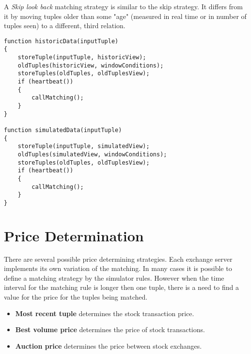 \documentclass{article}
\begin{document}
\noindent A \emph{Skip look back} matching strategy is similar to the skip strategy. It differs from it by moving tuples older than some "age" (measured in real time or in number of tuples seen) to a different, third relation.
\begin{verbatim}   
function historicData(inputTuple)
{
    storeTuple(inputTuple, historicView);
    oldTuples(historicView, windowConditions);
    storeTuples(oldTuples, oldTuplesView);
    if (heartbeat())
    {
        callMatching();
    }
}

function simulatedData(inputTuple)
{
    storeTuple(inputTuple, simulatedView);
    oldTuples(simulatedView, windowConditions);
    storeTuples(oldTuples, oldTuplesView);
    if (heartbeat())
    {
        callMatching();
    }
}
\end{verbatim}


\section{Price Determination}

There are several possible price determining strategies. Each exchange server implements its own variation of the matching. In many cases it is possible to define a matching strategy by the simulator rules. However when the time interval for the matching rule is longer then one tuple, there is a need to find a value for the price for the tuples being matched.

\begin{itemize}
    \item {\bf Most recent tuple} determines the stock transaction price.
    \item {\bf Best volume price} determines the price of stock transactions.  
    \item {\bf Auction price} determines the price between stock exchanges.
\end{itemize}
\end{document}
